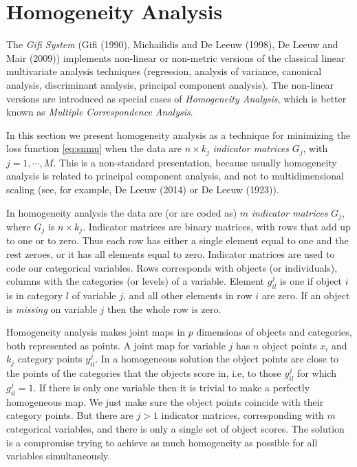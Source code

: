 \documentclass[
  12pt,
]{article}
\begin{document}
\section{Homogeneity Analysis}\label{hom}

The \emph{Gifi System} (Gifi (1990), Michailidis and De Leeuw (1998), De Leeuw and Mair (2009)) implements non-linear or non-metric versions of the classical linear multivariate analysis techniques (regression, analysis of variance, canonical analysis, discriminant analysis, principal component analysis). The non-linear versions are introduced as special cases of \emph{Homogeneity Analysis}, which is better known as \emph{Multiple Correspondence Analysis}.

In this section we present homogeneity analysis as a technique for
minimizing the loss function \eqref{eq:snmu} when the data are \(n\times k_j\) \emph{indicator matrices} \(G_j\), with \(j=1,\cdots,M\). This is a non-standard presentation, because usually homogeneity analysis is related to principal component analysis, and not to multidimensional scaling
(see, for example, De Leeuw (2014) or De Leeuw (1923)).

In homogeneity analysis the data are (or are coded as) \(m\) \emph{indicator matrices} \(G_j\), where \(G_j\) is \(n\times k_j\).
Indicator matrices are binary matrices, with rows that add up to one or to zero.
Thus each row has either a single element equal to one and the rest zeroes, or it has all elements equal to zero. Indicator matrices are
used to code our categorical variables. Rows corresponds with objects
(or individuals), columns with the categories (or levels) of a variable.
Element \(g_{il}^j\) is one if object \(i\) is in category \(l\) of variable \(j\), and all other elements in row \(i\) are zero. If an object is \emph{missing} on variable \(j\) then the whole row is zero.

Homogeneity analysis makes joint maps in \(p\) dimensions of objects
and categories, both represented as points. A joint map for variable \(j\)
has \(n\) object points \(x_i\) and \(k_j\) category points \(y^j_{il}\).
In a homogeneous solution the object points are close to the points of the categories that the objects score in, i.e, to those \(y^j_{il}\) for which \(g^j_{il}=1\). If there is only one variable then it is trivial to make a perfectly homogeneous map. We just make sure the object points coincide with their category points. But there are \(j>1\) indicator matrices, corresponding with \(m\) categorical variables, and there is only a single set of object scores. The solution is a compromise trying to achieve as much homogeneity as possible for all variables simultaneously.
\end{document}
